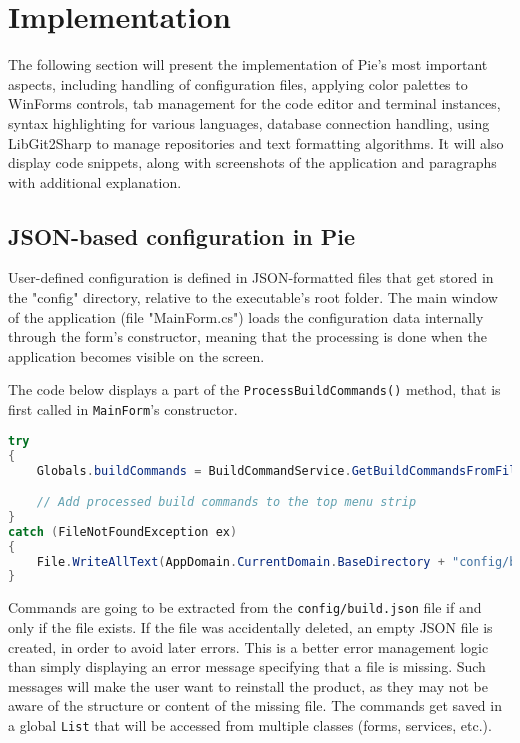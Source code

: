 \chapter{Implementation}
\thispagestyle{pagestyle}

The following section will present the implementation of Pie's most important aspects, including handling of configuration files, applying color palettes to WinForms controls, tab management for the code editor and terminal instances, syntax highlighting for various languages, database connection handling, using LibGit2Sharp to manage repositories and text formatting algorithms. It will also display code snippets, along with screenshots of the application and paragraphs with additional explanation.

\section{JSON-based configuration in Pie}

User-defined configuration is defined in JSON-formatted files that get stored in the "config" directory, relative to the executable's root folder. The main window of the application (file "MainForm.cs") loads the configuration data internally through the form's constructor, meaning that the processing is done when the application becomes visible on the screen.

The code below displays a part of the \texttt{ProcessBuildCommands()} method, that is first called in \texttt{MainForm}'s constructor.

\begin{lstlisting}[language=csharp, caption={Build command processing logic in MainForm's constructor}]
try
{
    Globals.buildCommands = BuildCommandService.GetBuildCommandsFromFile("config/build.json");

    // Add processed build commands to the top menu strip
}
catch (FileNotFoundException ex)
{
    File.WriteAllText(AppDomain.CurrentDomain.BaseDirectory + "config/build.json", "[]");
}

\end{lstlisting}

Commands are going to be extracted from the \texttt{config/build.json} file if and only if the file exists. If the file was accidentally deleted, an empty JSON file is created, in order to avoid later errors. This is a better error management logic than simply displaying an error message specifying that a file is missing. Such messages will make the user want to reinstall the product, as they may not be aware of the structure or content of the missing file. The commands get saved in a global \texttt{List} that will be accessed from multiple classes (forms, services, etc.).

